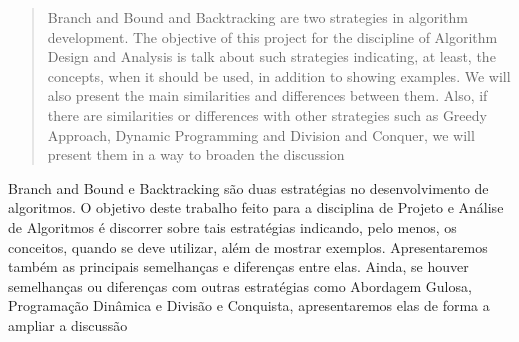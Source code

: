 
\begin{abstract}
    Branch and Bound and Backtracking are two strategies in algorithm development.
    The objective of this project for the discipline of Algorithm Design and Analysis is
    talk about such strategies indicating, at least, the concepts, when it should be
    used, in addition to showing examples. We will also present the main similarities
    and differences between them. Also, if there are similarities or differences with other strategies such as
    Greedy Approach, Dynamic Programming and Division and Conquer, we will present them in a way
    to broaden the discussion
  \end{abstract}
       
  \begin{resumo} 
    Branch and Bound e Backtracking são duas estratégias no desenvolvimento de algoritmos. 
    O objetivo deste trabalho feito para a disciplina de Projeto e Análise de Algoritmos é 
    discorrer sobre tais estratégias indicando, pelo menos, os conceitos, quando se deve 
    utilizar, além de mostrar exemplos. Apresentaremos também as principais semelhanças 
    e diferenças entre elas. Ainda, se houver semelhanças ou diferenças com outras estratégias como
    Abordagem Gulosa, Programação Dinâmica e Divisão e Conquista, apresentaremos elas de forma 
    a ampliar a discussão
  \end{resumo}
  